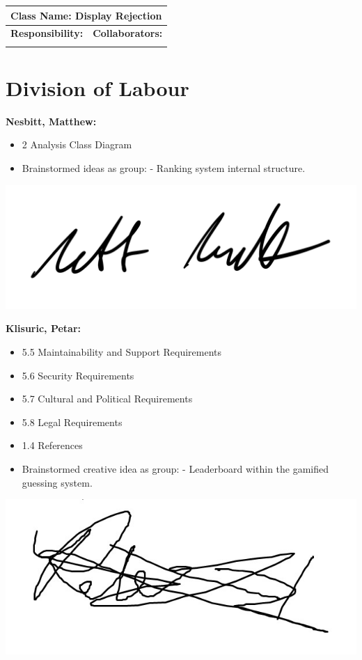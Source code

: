 \documentclass[]{article}
\begin{document}
\begin{itemize}
	\begin{table}
		\centering
		\begin{tabular}{|p{5cm}|p{5cm}|}
		\hline 
		 \multicolumn{2}{|l|}{\textbf{Class Name:} Display Rejection} \\
		\hline
		\textbf{Responsibility:} & \textbf{Collaborators:} \\
		\hline
		\vspace{1in} & \\
		\hline
		\end{tabular}
	\end{table}

\end{itemize}

\appendix
\section{Division of Labour}
\label{sec:division_of_labour}
\textbf{Nesbitt, Matthew:}
\begin{itemize}
	\item 2 Analysis Class Diagram
	\item Brainstormed ideas as group:
		\subitem - Ranking system internal structure.
\end{itemize}
\includegraphics[scale=0.15]{mattsignature.jpg}

\textbf{Klisuric, Petar:}
\begin{itemize}
	\item 5.5 Maintainability and Support Requirements
	\item 5.6 Security Requirements
	\item 5.7 Cultural and Political Requirements
	\item 5.8 Legal Requirements
	\item 1.4 References
    \item Brainstormed creative idea as group:
		\subitem - Leaderboard within the gamified guessing system.
\end{itemize}
\includegraphics[scale=0.15]{petarsignature.jpg}
\end{document}
